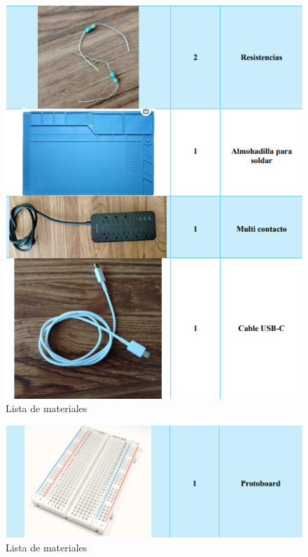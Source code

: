     \begin{figure}[H]
        \centering
        \includegraphics[trim = {0mm 0mm 0mm 0mm},clip,scale=0.5]{12/Img/listaDeMateriales2.png}
        \caption{Lista de materiales}
        \label{fig:listaDeMateriales2.png}
    \end{figure}
    
    \begin{figure}[H]
        \centering
        \includegraphics[trim = {0mm 0mm 0mm 0mm},clip,scale=0.5]{12/Img/listaDeMateriales3.png}
        \caption{Lista de materiales}
        \label{fig:listaDeMateriales3.png}
    \end{figure}
    
